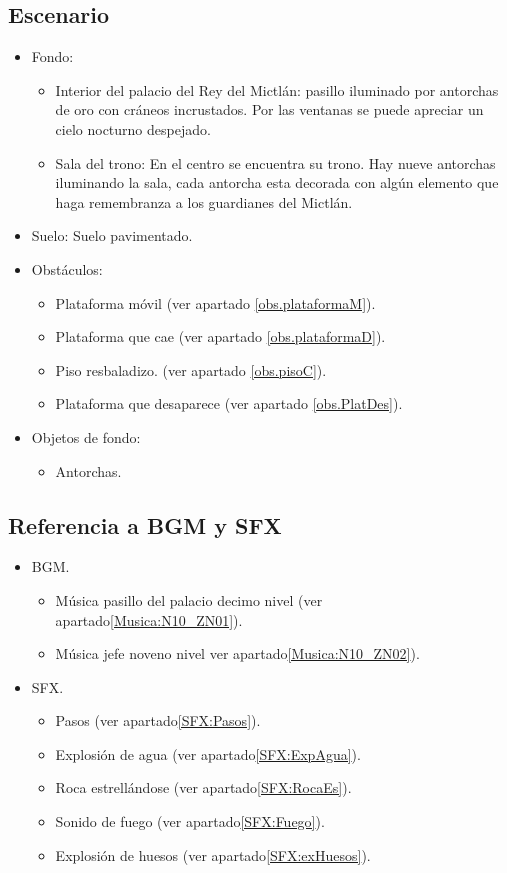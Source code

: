 	\subsection{Escenario}
\begin{itemize} 
	\item Fondo: 
	\begin{itemize}
		\item Interior del palacio del Rey del Mictlán: pasillo iluminado por antorchas de oro con cráneos incrustados. Por las ventanas se puede apreciar un cielo nocturno despejado.
		\item Sala del trono: En el centro se encuentra su trono. Hay nueve antorchas iluminando la sala, cada antorcha esta decorada con algún elemento que haga remembranza a los guardianes del Mictlán. 
	\end{itemize}
	\item Suelo: Suelo pavimentado.
	\item Obstáculos:
	\begin{itemize}
			\item Plataforma móvil (ver apartado \ref{obs.plataformaM}).
			\item Plataforma que cae (ver apartado \ref{obs.plataformaD}).
			\item Piso resbaladizo. (ver apartado \ref{obs.pisoC}).
			\item Plataforma que desaparece (ver apartado \ref{obs.PlatDes}).
		\end{itemize}
	\item Objetos de fondo: 
		\begin{itemize}
			\item Antorchas.
		\end{itemize}
\end{itemize}	
	\subsection{Referencia a BGM y SFX}
	\begin{itemize}
		\item BGM.
			\begin{itemize}
				\item Música pasillo del palacio decimo nivel (ver apartado\ref{Musica:N10_ZN01}).
				\item Música jefe noveno nivel ver apartado\ref{Musica:N10_ZN02}).
			\end{itemize}
		\item SFX.
			\begin{itemize}
				\item Pasos (ver apartado\ref{SFX:Pasos}).
				\item Explosión de agua (ver apartado\ref{SFX:ExpAgua}).
				\item Roca estrellándose (ver apartado\ref{SFX:RocaEs}).
				\item Sonido de fuego (ver apartado\ref{SFX:Fuego}).
				\item Explosión de huesos (ver apartado\ref{SFX:exHuesos}).
			\end{itemize}
	\end{itemize}

